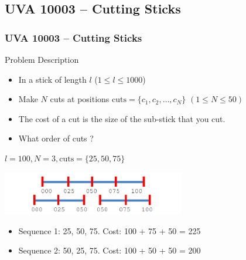 \subsection{UVA 10003 -- Cutting Sticks}
\begin{frame}
  \frametitle{UVA 10003 -- Cutting Sticks}

  {\smaller
    \begin{block}{Problem Description}
      \begin{itemize}
      \item In a stick of length $l$ ($1 \leq l \leq 1000$)
      \item Make $N$ cuts at positions $\text{cuts} = \{c_1, c_2,
        \ldots, c_N\}$ $(1 \leq N \leq 50)$
      \item The cost of a cut is the size of the sub-stick that you cut.
      \item What order of cuts ?
      \end{itemize}
  \end{block}

  \medskip

   $l=100, N=3, \text{cuts}=\{25,50,75\}$

  \begin{center}
    \includegraphics[width=0.6\textwidth]{../img/cuttingsticks}
  \end{center}

  \begin{itemize}
  \item Sequence 1: 25, 50, 75. Cost: 100 + 75 + 50 = 225
  \item Sequence 2: 50, 25, 75. Cost: 100 + 50 + 50 = 200
  \end{itemize}
  }
\end{frame}

